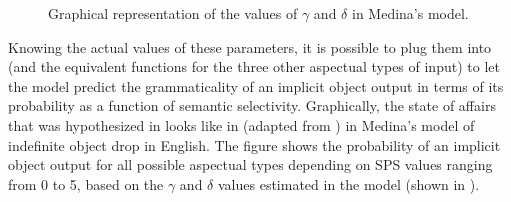 \begin{figure}[htb]
\caption{Graphical representation of the values of $\gamma$ and $\delta$ in Medina's model.}
\end{figure}

Knowing the actual values of these parameters, it is possible to plug them into  (and the equivalent functions for the three other aspectual types of input) to let the model predict the grammaticality of an implicit object output in terms of its probability as a function of semantic selectivity. Graphically, the state of affairs that was hypothesized in  looks like in  (adapted from \textcite[145]{Medina2007}) in Medina's model of indefinite object drop in English. The figure shows the probability of an implicit object output for all possible aspectual types depending on SPS values ranging from 0 to 5, based on the $\gamma$ and $\delta$ values estimated in the model (shown in ).

